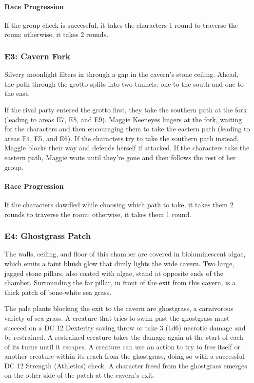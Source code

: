 \documentclass[10pt,a4,twoside,twocolumn,openany,nodeprecatedcode]{dndbook}
\begin{document}
\paragraph{Race Progression}
If the group check is successful, it takes the characters 1 round to traverse the room; otherwise, it takes 2 rounds.
\subsubsection{E3: Cavern Fork}
\begin{DndReadAloud}{}
Silvery moonlight filters in through a gap in the cavern's stone ceiling. Ahead, the path through the grotto splits into two tunnels: one to the south and one to the east.
\end{DndReadAloud}

If the rival party entered the grotto first, they take the southern path at the fork (leading to areas E7, E8, and E9). Maggie Keeneyes lingers at the fork, waiting for the characters and then encouraging them to take the eastern path (leading to areas E4, E5, and E6). If the characters try to take the southern path instead, Maggie blocks their way and defends herself if attacked. If the characters take the eastern path, Maggie waits until they're gone and then follows the rest of her group.
\paragraph{Race Progression}
If the characters dawdled while choosing which path to take, it takes them 2 rounds to traverse the room; otherwise, it takes them 1 round.
\subsubsection{E4: Ghostgrass Patch}
\begin{DndReadAloud}{}
The walls, ceiling, and floor of this chamber are covered in bioluminescent algae, which emits a faint bluish glow that dimly lights the wide cavern. Two large, jagged stone pillars, also coated with algae, stand at opposite ends of the chamber. Surrounding the far pillar, in front of the exit from this cavern, is a thick patch of bone-white sea grass.
\end{DndReadAloud}

The pale plants blocking the exit to the cavern are ghostgrass, a carnivorous variety of sea grass. A creature that tries to swim past the ghostgrass must succeed on a DC 12 Dexterity saving throw or take 3 (1d6) necrotic damage and be restrained. A restrained creature takes the damage again at the start of each of its turns until it escapes.
A creature can use an action to try to free itself or another creature within its reach from the ghostgrass, doing so with a successful DC 12 Strength (Athletics) check. A character freed from the ghostgrass emerges on the other side of the patch at the cavern's exit.
\end{document}
